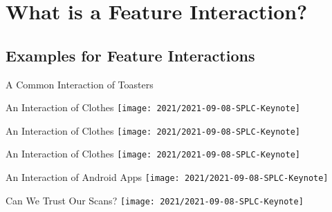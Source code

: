 \documentclass[
	aspectratio=169, %
	8pt, %
	handout, %
]{beamer}
\subtitle{9. Feature Interactions}
\author{Thomas Thüm}
\begin{document}


\section{What is a Feature Interaction?}

\subsection{Examples for Feature Interactions}
\begin{frame}{A Common Interaction of Toasters}
\end{frame}

\begin{frame}{An Interaction of Clothes}
	\centering\texttt{[image: 2021/2021-09-08-SPLC-Keynote]}
\end{frame}
\begin{frame}{An Interaction of Clothes}
	\centering\texttt{[image: 2021/2021-09-08-SPLC-Keynote]}
\end{frame}
\begin{frame}{An Interaction of Clothes}
	\centering\texttt{[image: 2021/2021-09-08-SPLC-Keynote]}
\end{frame}

\begin{frame}{An Interaction of Android Apps}
	\centering\texttt{[image: 2021/2021-09-08-SPLC-Keynote]}
\end{frame}

\begin{frame}{Can We Trust Our Scans?}
	\centering\texttt{[image: 2021/2021-09-08-SPLC-Keynote]}
\end{frame}
\end{document}
